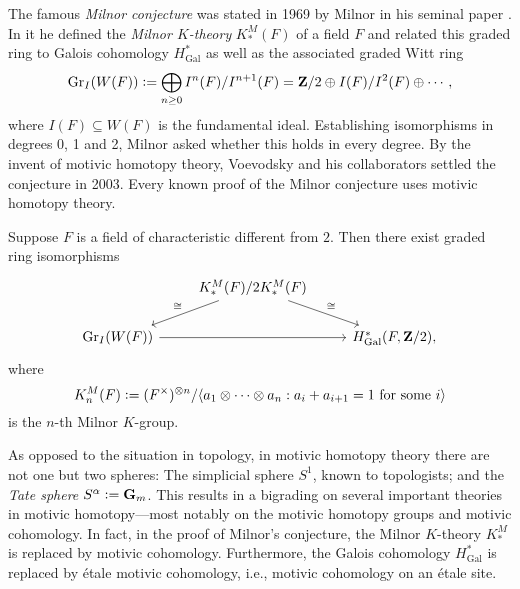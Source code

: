 



%
The famous \emph{Milnor conjecture} was stated in 1969 by Milnor in his seminal paper \cite{Milnor-quad-forms}. In it he defined the \emph{Milnor $K$-theory} $K_*^M(F)$ of a field $F$ and related this graded ring to Galois cohomology $H_{\mathrm{Gal}}^*$ as well as the associated graded Witt ring 
\[\operatorname{Gr}_I(W(F))\vcentcolon=\bigoplus_{n\ge0}I^n(F)/I^{n+1}(F)=\mathbf{Z}/2\oplus I(F)/I^2(F)\oplus\cdots,\]where $I(F)\subseteq W(F)$ is the fundamental ideal. Establishing isomorphisms in degrees 0, 1 and 2, Milnor asked whether this holds in every degree. By the invent of motivic homotopy theory, Voevodsky and his collaborators settled the conjecture in 2003. Every known proof of the Milnor conjecture uses motivic homotopy theory.

\begin{theorem}
Suppose $F$ is a field of characteristic different from $2$. Then there exist graded ring isomorphisms
\[\begin{tikzcd}
 & K_*^M(F)/2K^M_*(F)\arrow{ld}[swap]{\cong}\arrow{rd}{\cong} & \\
\Gr_I(W(F))\arrow{rr} & &H^*_{\mathrm{Gal}}(F,\Z/2),
\end{tikzcd}\]
where
\[
K_n^M(F)\vcentcolon= (F^\times)^{\otimes n}/\langle a_1\otimes\cdots\otimes a_n:a_i+a_{i+1}=1\text{ for some }i\rangle
\]is the $n$-th Milnor $K$-group.\end{theorem}

As opposed to the situation in topology, in motivic homotopy theory there are not one but two spheres: The simplicial sphere $S^1$, known to topologists; and the \emph{Tate sphere} $S^\alpha\vcentcolon=\mathbf{G}_m$. This results in a bigrading on several important theories in motivic homotopy---most notably on the motivic homotopy groups and motivic cohomology. In fact, in the proof of Milnor's conjecture, the Milnor $K$-theory $K_*^M$ is replaced by motivic cohomology. Furthermore, the Galois cohomology $H_{\mathrm{Gal}}^*$ is replaced by étale motivic cohomology, i.e., motivic cohomology on an étale site.

